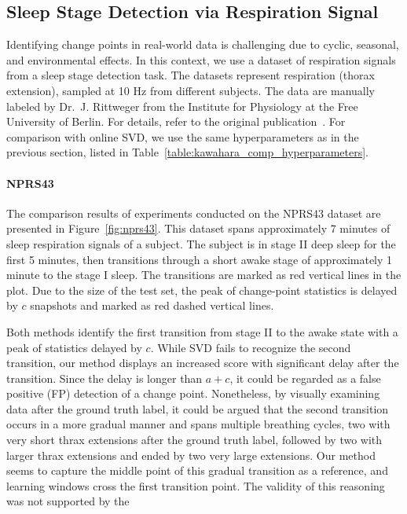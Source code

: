 \subsection{Sleep Stage Detection via Respiration Signal}
Identifying change points in real-world data is challenging due to cyclic, seasonal, and environmental effects. In this context, we use a dataset of respiration signals from a sleep stage detection task. The datasets represent respiration (thorax extension), sampled at 10 Hz from different subjects. The data are manually labeled by Dr.~J. Rittweger from the Institute for Physiology at the Free University of Berlin. For details, refer to the original publication~\citep{Keogh2005}. For comparison with online SVD, we use the same hyperparameters as in the previous section, listed in Table~\ref{table:kawahara_comp_hyperparameters}.

\paragraph{NPRS43}
The comparison results of experiments conducted on the NPRS43 dataset are presented in Figure~\ref{fig:nprs43}. This dataset spans approximately 7 minutes of sleep respiration signals of a subject. The subject is in stage II deep sleep for the first 5 minutes, then transitions through a short awake stage of approximately 1 minute to the stage I sleep. The transitions are marked as red vertical lines in the plot. Due to the size of the test set, the peak of change-point statistics is delayed by \(c\) snapshots and marked as red dashed vertical lines.

Both methods identify the first transition from stage II to the awake state with a peak of statistics delayed by \(c\). While SVD fails to recognize the second transition, our method displays an increased score with significant delay after the transition. Since the delay is longer than \(a + c\), it could be regarded as a false positive (FP) detection of a change point. Nonetheless, by visually examining data after the ground truth label, it could be argued that the second transition occurs in a more gradual manner and spans multiple breathing cycles, two with very short thrax extensions after the ground truth label, followed by two with larger thrax extensions and ended by two very large extensions. Our method seems to capture the middle point of this gradual transition as a reference, and learning windows cross the first transition point. The validity of this reasoning was not supported by the

